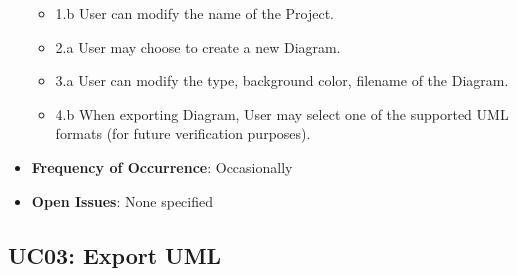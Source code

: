 \documentclass[12pt]{article}
\begin{document}
\begin{itemize}
\begin{itemize}
        \item 1.b User can modify the name of the Project.
        \item 2.a User may choose to create a new Diagram.
        \item 3.a User can modify the type, background color, filename of the Diagram.
        \item 4.b When exporting Diagram, User may select one of the supported UML formats (for future verification purposes).
    \end{itemize}
    \item \textbf{Frequency of Occurrence}: Occasionally
    \item \textbf{Open Issues}: None specified
\end{itemize}

\subsection{UC03: Export UML}
\end{document}
